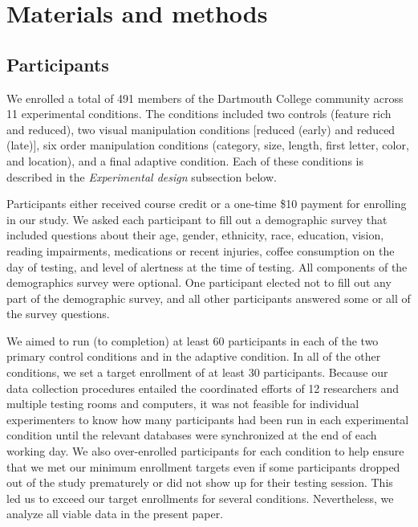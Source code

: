 \documentclass[11pt]{article}
\begin{document}
\section*{Materials and methods}

\subsection*{Participants}

We enrolled a total of 491 members of the Dartmouth College community across 11
experimental conditions. The conditions included two controls (feature rich and
reduced), two visual manipulation conditions [reduced (early) and reduced
(late)], six order manipulation conditions (category, size, length, first
letter, color, and location), and a final adaptive condition. Each of these
conditions is described in the \textit{Experimental design} subsection below.

Participants either received course credit or a one-time \$10 payment for
enrolling in our study. We asked each participant to fill out a demographic
survey that included questions about their age, gender, ethnicity, race,
education, vision, reading impairments, medications or recent injuries, coffee
consumption on the day of testing, and level of alertness at the time of
testing. All components of the demographics survey were optional. One
participant elected not to fill out any part of the demographic survey, and all
other participants answered some or all of the survey questions.

We aimed to run (to completion) at least 60 participants in each of the two
primary control conditions and in the adaptive condition. In all of the other
conditions, we set a target enrollment of at least 30 participants. Because our
data collection procedures entailed the coordinated efforts of 12 researchers
and multiple testing rooms and computers, it was not feasible for individual
experimenters to know how many participants had been run in each experimental
condition until the relevant databases were synchronized at the end of each
working day. We also over-enrolled participants for each condition to help
ensure that we met our minimum enrollment targets even if some participants
dropped out of the study prematurely or did not show up for their testing
session. This led us to exceed our target enrollments for several conditions.
Nevertheless, we analyze all viable data in the present paper.
\end{document}
